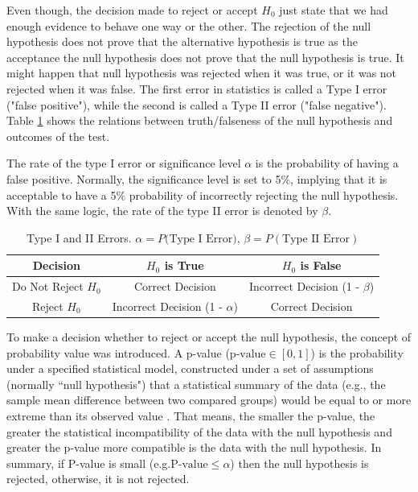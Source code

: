 Even though, the decision made to reject or accept $H_0$ just state that we had
enough evidence to behave one way or the other.
The rejection of the null hypothesis does not prove that the alternative hypothesis is true as
the acceptance the null hypothesis does not prove that the null hypothesis is true.
It might happen that null hypothesis was rejected when it was true, or it was not
rejected when it was false. The first error in statistics is called a Type I error ("false positive"),
 while the second is called a Type II error ("false negative").
Table \ref{type_errors} shows the relations between truth/falseness of the null hypothesis and outcomes of the test.

The rate of the type I error  or significance level
$\alpha$ is the probability of having a false positive.
Normally, the significance level is set to 5\%, implying that it is acceptable to have a 5\%
probability of incorrectly rejecting the null hypothesis. With the same logic, the rate of the
type II error is denoted by $\beta$.

\begin{table}[]
  \centering
  \caption{Type I and II Errors. $\alpha = P(\textrm{Type I Error)}$, $\beta = P(\textrm{Type II Error})$}
  \label{type_errors}
  \begin{tabular}{ccc}
    \toprule
    \textbf{Decision} & \textbf{$H_0$ is True} & \textbf{$H_0$ is False} \\ \midrule
  Do Not Reject $H_0$ & Correct Decision  & Incorrect Decision (1 - $\beta$)\\
  Reject $H_0$ & Incorrect Decision (1 -  $\alpha$)& Correct Decision \\ \bottomrule
  \end{tabular}
\end{table}

To make a decision whether to reject or accept the null hypothesis, the concept of
probability value was introduced. A p-value  ($\textrm{p-value}\in [0,1]$) is the probability under a specified statistical model, constructed under a set of assumptions (normally “null hypothesis") that a statistical summary of the data
(e.g., the sample mean difference between two compared groups) would be equal to or more extreme than its observed value \cite{wasserstein2016asa}. That means, the smaller the p-value, the greater the statistical incompatibility of the data with the null hypothesis and greater the p-value more compatible is the data with the null hypothesis.
In summary, if P-value is small (e.g.$\textrm{P-value} \leq \alpha$) then the null hypothesis is rejected,
otherwise, it is not rejected.

